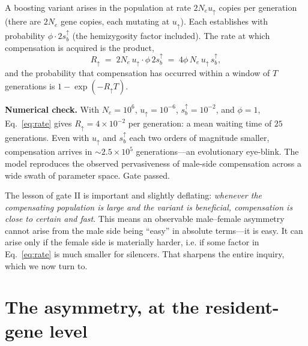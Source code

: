 \documentclass[11pt,a4paper]{article}
\newcommand{\Ne}{N_{e}}
\begin{document}
A boosting variant arises in the population at rate $2\Ne u_{\uparrow}$ copies per generation (there are $2\Ne$ gene copies, each mutating at $u_{\uparrow}$). Each establishes with probability $\phi\cdot 2 s_b^{\uparrow}$ (the hemizygosity factor included). The rate at which compensation is acquired is the product,
\begin{equation}
R_{\uparrow} \;=\; 2\Ne\,u_{\uparrow}\cdot \phi\,2 s_b^{\uparrow} \;=\; 4\phi\,\Ne\,u_{\uparrow}\,s_b^{\uparrow},
\label{eq:rate}
\end{equation}
and the probability that compensation has occurred within a window of $T$ generations is $1-\exp(-R_{\uparrow}T)$.

\begin{checkpoint}
\textbf{Numerical check.} With $\Ne=10^{6}$, $u_{\uparrow}=10^{-6}$, $s_b^{\uparrow}=10^{-2}$, and $\phi=1$, Eq.~\eqref{eq:rate} gives $R_{\uparrow}=4\times10^{-2}$ per generation: a mean waiting time of $25$ generations. Even with $u_{\uparrow}$ and $s_b^{\uparrow}$ each two orders of magnitude smaller, compensation arrives in $\sim 2.5\times10^{5}$ generations---an evolutionary eye-blink. The model reproduces the observed pervasiveness of male-side compensation across a wide swath of parameter space. Gate passed.
\end{checkpoint}

The lesson of gate II is important and slightly deflating: \emph{whenever the compensating population is large and the variant is beneficial, compensation is close to certain and fast}. This means an observable male--female asymmetry cannot arise from the male side being ``easy'' in absolute terms---it is easy. It can arise only if the female side is materially harder, i.e. if some factor in Eq.~\eqref{eq:rate} is much smaller for silencers. That sharpens the entire inquiry, which we now turn to.

\section{The asymmetry, at the resident-gene level}
\end{document}
